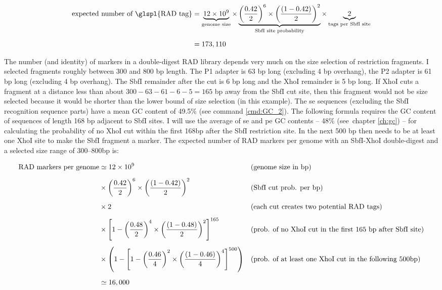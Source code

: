 \documentclass[a4paper,12pt,times,authoryear,twoside,print,index]{Classes/PhDThesisPSnPDF}\usepackage[]{graphicx}\usepackage[]{color}
\begin{document}
\scriptsize
\begin{align}
\text{expected number of \glspl{RAD tag}} &= \underbrace{12 \times 10^{9}}_{\text{genome size}} \times 
\underbrace{ \left( \frac{0.42}{2}\right)^{6} \times \left( \frac{(1-0.42)}{2} \right)^{2} }_{\text{SbfI site probability}} \times 
\underbrace{2}_{\text{tags per SbfI site}}
\label{eq:exp_num_standard_RAD_loci} \\[5pt] 
&= 173,110 \nonumber
\end{align}
\normalsize

The number (and identity) of markers in a double-digest RAD library depends very much on the size selection of restriction fragments. I selected fragments roughly between 300 and 800 \gls{bp} length. The P1 adapter is 63 bp long (excluding 4 bp overhang), the P2 adapter is 61 bp long (excluding 4 bp overhang). The \gls{SbfI} remainder after the cut is 6 \gls{bp} long and the \gls{XhoI} remainder is 5 \gls{bp} long. If \gls{XhoI} cuts a fragment at a distance less than about $300 - 63 - 61 -6 -5 = 165$ \gls{bp} away from the SbfI cut site, then this fragment would not be size selected because it would be shorter than the lower bound of size selection (in this example). The \gls{se} sequences (excluding the SbfI recognition sequence parts) have a mean GC content of 49.5\% (see command \ref{cmd:GC_2}). 
The following formula requires the GC content of sequences of length 168 \gls{bp} adjacent to SbfI sites. I will use the average of \gls{se} and \gls{pe} GC contents -- 48\% (see~chapter \ref{ch:gc}) -- for calculating the probability of no XhoI cut within the first 168bp after the SbfI restriction site. In the next 500 \gls{bp} then needs to be at least one \gls{XhoI} site to make the SbfI fragment a marker.
The expected number of RAD markers per genome with an SbfI-XhoI double-digest and a selected size range of 300--800bp is:


\scriptsize
\begin{align} %
\text{RAD markers per genome} &\simeq 12 \times 10^{9} 
	&&\text{(genome size in bp)}  \label{eq:exp_number_ddRAD_loci} \\[5pt]
&\times \left(\frac{0.42}{2}\right)^{6}\times \left(\frac{(1-0.42)}{2}\right)^{2} &&\text{(SbfI cut prob. per bp)} \notag \\[5pt]
&\times 2 
	&&\text{(each cut creates two potential RAD tags)} \notag \\[5pt]
&\times \left[1-\left(\frac{0.48}{2}\right)^{4} \times \left( \frac{(1-0.48)}{2}\right)^{2} \right]^{165} 
	&&\text{(prob. of no XhoI cut in the first 165 bp after SbfI site)} \notag \\[5pt]
&\times \left(1- \left[1-\left(\frac{0.46}{4}\right)^{2} \times \left( \frac{(1-0.46)}{4}\right)^{4} \right]^{500} \right) 
	&&\text{(prob. of at least one XhoI cut in the following 500bp)} \notag \\[5pt]
&\simeq 16,000 \nonumber
\end{align}
\normalsize
\end{document}
